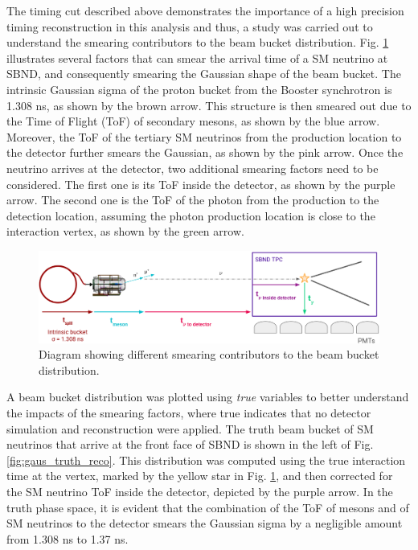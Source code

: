 The timing cut described above demonstrates the importance of a high precision timing reconstruction in this analysis and thus, a study was carried out to understand the smearing contributors to the beam bucket distribution. 
Fig. \ref{fig:smearing_factors} illustrates several factors that can smear the arrival time of a SM neutrino at SBND, and consequently smearing the Gaussian shape of the beam bucket.
The intrinsic Gaussian sigma of the proton bucket from the Booster synchrotron is 1.308 ns, as shown by the brown arrow.
This structure is then smeared out due to the Time of Flight (ToF) of secondary mesons, as shown by the blue arrow.
Moreover, the ToF of the tertiary SM neutrinos from the production location to the detector further smears the Gaussian, as shown by the pink arrow.
Once the neutrino arrives at the detector, two additional smearing factors need to be considered.
The first one is its ToF inside the detector, as shown by the purple arrow.
The second one is the ToF of the photon from the production to the detection location, assuming the photon production location is close to the interaction vertex, as shown by the green arrow.

\begin{figure}[h!]
    \centering
    \includegraphics[width=1.0\textwidth]{smearing_factors.png}
    \caption{Diagram showing different smearing contributors to the beam bucket distribution.}
    \label{fig:smearing_factors}
\end{figure}

A beam bucket distribution was plotted using \textit{true} variables to better understand the impacts of the smearing factors, where true indicates that no detector simulation and reconstruction were applied.
The truth beam bucket of SM neutrinos that arrive at the front face of SBND is shown in the left of Fig. \ref{fig:gaus_truth_reco}.
This distribution was computed using the true interaction time at the vertex, marked by the yellow star in Fig. \ref{fig:smearing_factors}, and then corrected for the SM neutrino ToF inside the detector, depicted by the purple arrow.
In the truth phase space, it is evident that the combination of the ToF of mesons and of SM neutrinos to the detector smears the Gaussian sigma by a negligible amount from 1.308 ns to 1.37 ns.

